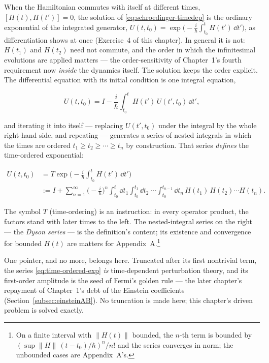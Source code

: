 When the Hamiltonian commutes with itself at different times, $[H(t), H(t')] = 0$, the solution of \eqref{eq:schroedinger-timedep} is the ordinary exponential of the integrated generator, $U(t, t_0) = \exp\!\bigl(-\frac{i}{\hbar}\int_{t_0}^{t}H(t')\,\dd t'\bigr)$, as differentiation shows at once (Exercise~4 of this chapter). In general it is not: $H(t_1)$ and $H(t_2)$ need not commute, and the order in which the infinitesimal evolutions are applied matters --- the order-sensitivity of Chapter~1's fourth requirement now \emph{inside} the dynamics itself. The solution keeps the order explicit. The differential equation with its initial condition is one integral equation,
\begin{linenomath}
    \begin{equation*}
        U(t, t_0) = I - \frac{i}{\hbar}\int_{t_0}^{t} H(t')\,U(t', t_0)\,\dd t',
    \end{equation*}
\end{linenomath}
and iterating it into itself --- replacing $U(t', t_0)$ under the integral by the whole right-hand side, and repeating --- generates a series of nested integrals in which the times are ordered $t_1 \geq t_2 \geq \cdots \geq t_n$ by construction. That series \emph{defines} the time-ordered exponential:
\begin{linenomath}
    \begin{equation}
        \begin{split}
            U(t, t_0) &= T\exp\!\biggl(-\frac{i}{\hbar}\int_{t_0}^{t}H(t')\,\dd t'\biggr) \\
            &:= I + \sum_{n=1}^{\infty}\biggl(-\frac{i}{\hbar}\biggr)^{n}\!\int_{t_0}^{t}\!\dd t_1\!\int_{t_0}^{t_1}\!\dd t_2\;\cdots\!\int_{t_0}^{t_{n-1}}\!\dd t_n\,H(t_1)\,H(t_2)\cdots H(t_n) .
        \end{split}
        \label{eq:time-ordered-exp}
    \end{equation}
\end{linenomath}
The symbol $T$ (time-ordering) is an instruction: in every operator product, the factors stand with later times to the left. The nested-integral series on the right --- the \emph{Dyson series} --- is the definition's content; its existence and convergence for bounded $H(t)$ are matters for Appendix~A.\footnote{On a finite interval with $\|H(t)\|$ bounded, the $n$-th term is bounded by $(\sup\|H\|\,(t-t_0)/\hbar)^n/n!$ and the series converges in norm; the unbounded cases are Appendix~A's.}

One pointer, and no more, belongs here. Truncated after its first nontrivial term, the series \eqref{eq:time-ordered-exp} \emph{is} time-dependent perturbation theory, and its first-order amplitude is the seed of Fermi's golden rule --- the later chapter's repayment of Chapter~1's debt of the Einstein coefficients (Section~\ref{subsec:einsteinAB}). No truncation is made here; this chapter's driven problem is solved exactly.

